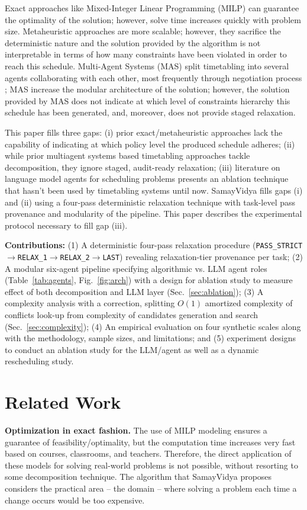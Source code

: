 \documentclass[conference]{IEEEtran}
\begin{document}
Exact approaches like Mixed-Integer Linear Programming (MILP) \cite{ref1,ref11,ref7} can guarantee the optimality of the solution; however, solve time increases quickly with problem size. Metaheuristic approaches \cite{ref3,ref4,ref8,ref10,ref12,ref14} are more scalable; however, they sacrifice the deterministic nature and the solution provided by the algorithm is not interpretable in terms of how many constraints have been violated in order to reach this schedule. Multi-Agent Systems (MAS) split timetabling into several agents collaborating with each other, most frequently through negotiation process \cite{ref9,ref6}; MAS increase the modular architecture of the solution; however, the solution provided by MAS does not indicate at which level of constraints hierarchy this schedule has been generated, and, moreover, does not provide staged relaxation.

This paper fills three gaps: (i) prior exact/metaheuristic approaches lack the capability of indicating at which policy level the produced schedule adheres; (ii) while prior multiagent systems based timetabling approaches tackle decomposition, they ignore staged, audit-ready relaxation; (iii) literature on language model agents for scheduling problems presents an ablation technique that hasn’t been used by timetabling systems until now. SamayVidya fills gaps (i) and (ii) using a four-pass deterministic relaxation technique with task-level pass provenance and modularity of the pipeline. This paper describes the experimental protocol necessary to fill gap (iii).

\textbf{Contributions:}  (1) A deterministic four-pass relaxation procedure (\texttt{PASS\_STRICT}$\rightarrow$\texttt{RELAX\_1}$\rightarrow$\texttt{RELAX\_2}$\rightarrow$\texttt{LAST}) revealing relaxation-tier provenance per task; (2) A modular six-agent pipeline specifying algorithmic vs. LLM agent roles (Table~\ref{tab:agents}, Fig.~\ref{fig:arch}) with a design for ablation study to measure effect of both decomposition and LLM layer (Sec.~\ref{sec:ablation}); (3) A complexity analysis with a correction, splitting $O(1)$ amortized complexity of conflicts look-up from complexity of candidates generation and search (Sec.~\ref{sec:complexity}); (4) An empirical evaluation on four synthetic scales along with the methodology, sample sizes, and limitations; and (5) experiment designs to conduct an ablation study for the LLM/agent as well as a dynamic rescheduling study.
\section{Related Work}
\textbf{Optimization in exact fashion.} The use of MILP modeling \cite{ref1,ref11,ref7} ensures a guarantee of feasibility/optimality, but the computation time increases very fast based on courses, classrooms, and teachers. Therefore, the direct application of these models for solving real-world problems is not possible, without resorting to some decomposition technique. The algorithm that SamayVidya proposes considers the practical area – the domain – where solving a problem each time a change occurs would be too expensive.
\end{document}
